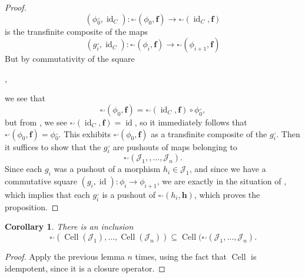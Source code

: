 \documentclass[leqno]{article}
\numberwithin{equation}{subsection}
\theoremstyle{plain}   %
\newtheorem{cor}[equation]{Corollary}
\theoremstyle{remark}
\theoremstyle{plain}
\DeclareMathOperator{\id}{id}
\begin{document}
\begin{proof}
	\[
		(\phi_0^\lrcorner,\id_C):\square^\lrcorner(\phi_0,\mathbf{f}) \to \square^\lrcorner(\id_C,\mathbf{f})
	\]
	is the transfinite composite of the maps 
	\[
		(g_i^\lrcorner,\id_C):\square^\lrcorner(\phi_i,\mathbf{f}) \to \square^\lrcorner(\phi_{i+1},\mathbf{f})
	\]
	But by commutativity of the square
	\begin{center}
		,
	\end{center}
	we see that 
	\[
		\square^\lrcorner(\phi_0,\mathbf{f}) = \square^\lrcorner(\id_C,\mathbf{f}) \circ \phi^\lrcorner_0,
	\] 
	but from , we see \(\square^\lrcorner(\id_C,\mathbf{f})=\id\), so it immediately follows that \(\square^\lrcorner(\phi_0,\mathbf{f}) = \phi^\lrcorner_0\). This exhibits \(\square^\lrcorner(\phi_0,\mathbf{f})\) as a transfinite composite of the \(g^\lrcorner_i\).  
	Then it suffices to show that the \(g_i^\lrcorner\) are pushouts of maps belonging to 
	\[\square^\lrcorner(\mathscr{J}_1,,\dots ,\mathscr{J}_n).\]
	Since each \(g_i\) was a pushout of a morphism \(h_i \in \mathscr{J}_1\), and since we have a commutative square \((g_i,\id):\phi_i\to \phi_{i+1}\), we are exactly in the situation of , which implies that each \(g_i^\lrcorner\) is a pushout of \(\square^\lrcorner(h_i,\mathbf{h})\), which proves the proposition.
\end{proof}
\begin{cor} 
	There is an inclusion
	\[\square^\lrcorner(\operatorname{Cell}(\mathscr{J}_1),\dots,\operatorname{Cell}(\mathscr{J}_n)) \subseteq \operatorname{Cell}(\square^\lrcorner(\mathscr{J}_1,\dots,\mathscr{J}_n).\]
\end{cor}
\begin{proof} 
	Apply the previous lemma \(n\) times, using the fact that \(\operatorname{Cell}\) is idempotent, since it is a closure operator.
\end{proof}
\end{document}
